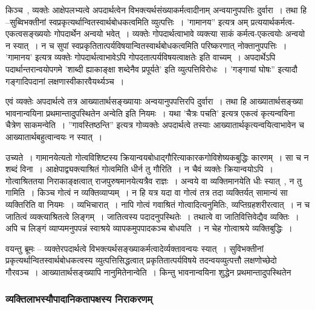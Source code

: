 				किञ्च~, व्यक्तेः आक्षेपलभ्यत्वे अपदार्थत्वेन विभक्त्यर्थसंख्याकर्मत्वादीनाम् अन्वयानुपपत्तिः दुर्वारा~।  तथा हि –सुब्विभक्तीनां स्वप्रकृत्यर्थान्वितस्वार्थबोधकत्वमिति व्युत्पत्तिः~।  ’गामानय” इत्यत्र अम् प्रत्ययार्थकर्मत्व-एकत्वसङ्ख्ययोः गोपदार्थेन अन्वयो भवेत्~।  व्यक्तेः गोपदार्थत्वाभावे व्यक्त्या साकं कर्मत्व-एकत्वयोः अन्वयो न स्यात्~।  न च सुपां स्वप्रकृतितात्पर्यविषयान्वितस्वार्थबोधकत्वमिति परिष्करणात् नोक्तानुपपत्तिः~।  ’गामानय’ इत्यत्र व्यक्तेः गोपदार्थत्वाभावेऽपि गोपदतात्पर्यविषयत्वाक्षतेः इति वाच्यम्~। अपदार्थेऽपि पदार्थान्तरान्वयोपगमे ’शाब्दी ह्याकाङ्क्षा शब्देनैव प्रपूर्यते’ इति व्युत्पत्तिविरोधः~।  ’गङ्गायां घोषः” इत्यादौ गङ्गादिपदानां लक्षणास्वीकारवैयर्थ्यञ्च~। 

				एवं व्यक्तेः अपदार्थत्वे तत्र आख्यातार्थसङ्ख्यायाः अन्वयानुपपत्तिरपि दुर्वारा~।  तथा हि आख्यातार्थसङ्ख्या भावनान्वयिना प्रथमान्तादुपस्थितेन अन्वेति इति नियमः~।  यथा ’चैत्रः पचति’ इत्यत्र एकत्वं कृत्यन्वयिना चैत्रेण साकमन्वेति~।  ”गावस्तिष्ठन्ति” इत्यत्र गोव्यक्तेः अपदार्थत्वे तस्याः आख्यातार्थकृत्यन्वयित्वाभावेन च आख्यातार्थबहुत्वान्वयः न स्यात्~। 
				
				\begin{small}
				
					उच्यते~। गामानयेत्यतो गोत्वविशिष्टस्य क्रियान्वयबोधाद्गौरित्याकारकगोविशेष्यकबुद्धिः कारणम्~। सा च न शब्दं विना~। आक्षेपाद्व्यक्त्याश्रितं गोत्वमिति धीर्न तु गौरिति~। न चैवं व्यक्तेः क्रियान्वयोऽपि~। गोत्वाश्रिततया निराकाङ्क्षत्वात् राजपुरुषमानयेत्यत्रैव राज्ञः~। अन्वये वा व्यक्तिमानयेति धीः स्यात्~, न तु गामिति~। किञ्च गोत्वं न व्यक्तिव्याप्यम्~। न हि यत्र यदा वा गोत्वं तत्र तदा व्यक्तिर्यत् सामान्यं सा व्यक्तिरिति वा नियमः~। व्यभिचारात्~। नापि गोत्वं गवाश्रितं गोत्वादित्यनुमितिः, व्यप्तिग्रहशरीरत्वात्~। न च जातित्वं व्यक्त्याश्रितत्वे लिङ्गम्~। जातित्वस्य पदादनुपस्थितेः~। तथात्वे वा जातिवित्तिवेद्यैव व्यक्तिः~। अपि च लिङ्गं व्याप्यमनुपपन्नं स्वाश्रये व्यापकमुपपादकञ्च बोधयति~। न चेह गोत्वाश्रये व्यक्तिबुद्धिः~।
				
					वयन्तु ब्रूमः – व्यक्तेरपदार्थत्वे विभक्त्यर्थसङ्ख्याकर्मत्वादेर्व्यक्तावन्वयः स्यात्~। सुविभक्तीनां प्रकृत्यर्थान्वितस्वार्थबोधकत्वस्य व्युत्पत्तिसिद्धत्वात् प्रकृतितात्पर्यविषये तदन्वयव्युत्पत्तौ लक्षणोच्छेदो गौरवञ्च~। आख्यातार्थसङ्ख्यापि नानुमितेनान्वेति~। किन्तु भावनान्वयिना शुद्धेन प्रथमान्तादुपस्थितेन
				\end{small}

			\subsubsection{व्यक्तिलाभस्यौपादानिकतापक्षस्य निराकरणम्}
				
